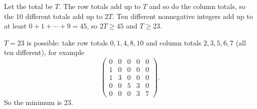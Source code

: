 Let the total be $T$. The row totals add up to $T$ and so do the column totals, so the $10$ different totals add up to $2T$. Ten different nonnegative integers add up to at least $0+1+\cdots+9=45$, so $2T\ge45$ and $T\ge23$.

$T=23$ is possible: take row totals $0,1,4,8,10$ and column totals $2,3,5,6,7$ (all ten different), for example
\[\begin{pmatrix}0&0&0&0&0\\1&0&0&0&0\\1&3&0&0&0\\0&0&5&3&0\\0&0&0&3&7\end{pmatrix}.\]
So the minimum is $\boxed{23}$.
